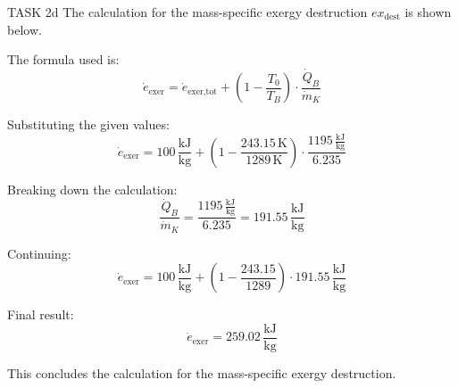TASK 2d  
The calculation for the mass-specific exergy destruction \( ex_{\text{dest}} \) is shown below.  

The formula used is:  
\[
\dot{e}_{\text{exer}} = \dot{e}_{\text{exer,tot}} + \left( 1 - \frac{T_0}{T_B} \right) \cdot \frac{\dot{Q}_B}{\dot{m}_K}
\]  

Substituting the given values:  
\[
\dot{e}_{\text{exer}} = 100 \, \frac{\text{kJ}}{\text{kg}} + \left( 1 - \frac{243.15 \, \text{K}}{1289 \, \text{K}} \right) \cdot \frac{1195 \, \frac{\text{kJ}}{\text{kg}}}{6.235}
\]  

Breaking down the calculation:  
\[
\frac{\dot{Q}_B}{\dot{m}_K} = \frac{1195 \, \frac{\text{kJ}}{\text{kg}}}{6.235} = 191.55 \, \frac{\text{kJ}}{\text{kg}}
\]  

Continuing:  
\[
\dot{e}_{\text{exer}} = 100 \, \frac{\text{kJ}}{\text{kg}} + \left( 1 - \frac{243.15}{1289} \right) \cdot 191.55 \, \frac{\text{kJ}}{\text{kg}}
\]  

Final result:  
\[
\dot{e}_{\text{exer}} = 259.02 \, \frac{\text{kJ}}{\text{kg}}
\]  

This concludes the calculation for the mass-specific exergy destruction.